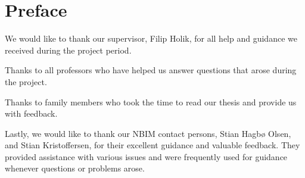 \chapter*{Preface}

We would like to thank our supervisor, Filip Holik, for all help and guidance we received during the project period. 

Thanks to all professors who have helped us answer questions that arose during the project. 

Thanks to family members who took the time to read our thesis and provide us with feedback.

Lastly, we would like to thank our NBIM contact persons, Stian Hagbø Olsen, and Stian Kristoffersen, for their excellent guidance and valuable feedback. They provided assistance with various issues and were frequently used for guidance whenever questions or problems arose.

\newpage